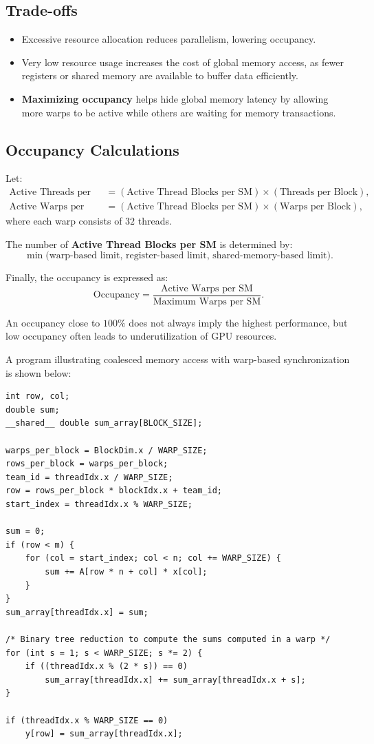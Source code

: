 \documentclass[12pt]{book}
\begin{document}
\subsection*{Trade-offs}
\begin{itemize}
    \item Excessive resource allocation reduces parallelism, lowering occupancy.
    \item Very low resource usage increases the cost of global memory access, as fewer registers or shared memory are available to buffer data efficiently.
    \item \textbf{Maximizing occupancy} helps hide global memory latency by allowing more warps to be active while others are waiting for memory transactions.
\end{itemize}

\subsection*{Occupancy Calculations}
Let:
\begin{align*}
    \text{Active Threads per SM} &= (\text{Active Thread Blocks per SM}) \times (\text{Threads per Block}), \\
    \text{Active Warps per SM} &= (\text{Active Thread Blocks per SM}) \times (\text{Warps per Block}),
\end{align*}
where each warp consists of $32$ threads.

The number of \textbf{Active Thread Blocks per SM} is determined by:
\[
\min\bigl(\text{warp-based limit},\, \text{register-based limit},\, \text{shared-memory-based limit}\bigr).
\]

Finally, the occupancy is expressed as:
\[
\text{Occupancy} = \frac{\text{Active Warps per SM}}{\text{Maximum Warps per SM}}.
\]

An occupancy close to $100\%$ does not always imply the highest performance, but low occupancy often leads to underutilization of GPU resources.

A program illustrating coalesced memory access with warp-based synchronization is shown below:

\begin{lstlisting}[style=cppstyle]
int row, col;
double sum;
__shared__ double sum_array[BLOCK_SIZE];

warps_per_block = BlockDim.x / WARP_SIZE;
rows_per_block = warps_per_block;
team_id = threadIdx.x / WARP_SIZE;
row = rows_per_block * blockIdx.x + team_id;
start_index = threadIdx.x % WARP_SIZE;

sum = 0;
if (row < m) {
    for (col = start_index; col < n; col += WARP_SIZE) {
        sum += A[row * n + col] * x[col];
    }
}
sum_array[threadIdx.x] = sum;

/* Binary tree reduction to compute the sums computed in a warp */
for (int s = 1; s < WARP_SIZE; s *= 2) {
    if ((threadIdx.x % (2 * s)) == 0)
        sum_array[threadIdx.x] += sum_array[threadIdx.x + s];
}

if (threadIdx.x % WARP_SIZE == 0)
    y[row] = sum_array[threadIdx.x];
\end{lstlisting}
\end{document}

